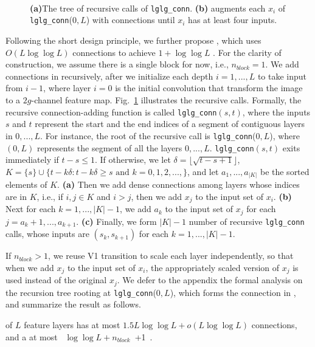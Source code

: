 
\section{\loglogdense}
\label{sec:loglogdense}


\begin{figure}
    \centering
    ~
    ~
    \cprotect\caption{\textbf{(a)}The tree of recursive calls of \verb=lglg_conn=. \textbf{(b)} \loglogdense augments each $x_i$ of \verb=lglg_conn=($0,L$) with \logdense connections until $x_i$ has at least four inputs.
    }
    \label{fig:loglog_recursion}
\end{figure}
Following the short \pbd design principle, we further propose \loglogdense, which uses $O(L\log \log L)$ connections to achieve $1+\log\log L$ \pbd. 
For the clarity of construction, we assume there is a single block for now, i.e., $n_{block}=1$.
We add connections in \loglogdense recursively, after we initialize each depth $i=1,...,L$ to take input from $i-1$, where layer $i=0$ is the initial convolution that transform the image to a $2g$-channel feature map. Fig.~\ref{fig:loglog_recursion} illustrates the recursive calls. Formally, the recursive connection-adding function is called \verb=lglg_conn=$(s,t)$, where the inputs $s$ and $t$ represent the start and the end indices of a segment of contiguous layers in $0,...,L$. For instance, the root of the recursive call is \verb=lglg_conn=($0,L$), where $(0,L)$ represents the segment of all the layers $0,...,L$.
\verb=lglg_conn=$(s,t)$ exits immediately if $t-s \leq 1$. 
If otherwise, we let $\delta = \lfloor \sqrt{t-s+1} \rfloor$, $K=\{s \} \cup \{ t- k \delta : t - k \delta  \geq s \text{ and }  k =0,1,2,..., \}$, and let $a_1,...,a_{|K|}$ be the sorted elements of $K$.
\textbf{(a)} Then we add dense connections among layers whose indices are in $K$, i.e., if $i, j \in K$ and $i > j$, then we add $x_j$ to the input set of $x_i$. \textbf{(b)} Next for each $k=1,..., |K|-1$, we add $a_{k}$ to the input set of $x_j$ for each $j=a_{k}+1,..., a_{k+1}$. \textbf{(c)} Finally, we form $|K|-1$ number of recursive \verb=lglg_conn= calls, whose inputs are
$(s_k, s_{k+1})$ for each $k=1,...,|K|-1$. 

If $n_{block} > 1$, we reuse \logdense V1 transition to scale each layer independently, so that when we add $x_j$ to the input set of $x_i$, the appropriately scaled version of $x_j$ is used instead of the original $x_j$. 
We defer to the appendix the formal analysis on the recursion tree rooting at \verb=lglg_conn=($0,L$), which forms the connection in \loglogdense, and summarize the result as follows.
\begin{proposition}
\label{them:loglog-dense-loglog-dist}
\loglogdense of $L$ feature layers has at most $1.5L \log\log L + o(L \log\log L)$ connections, and a \pbd at most \mbox{ $ \log\log L + n_{block}$ +1 }.
\end{proposition}

